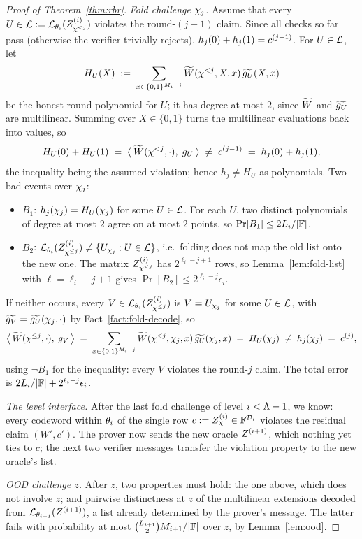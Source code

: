 \begin{proof}[Proof of Theorem~\ref{thm:rbr}]
\medskip\noindent\emph{Fold challenge $\chi_j$.}
Assume that every $U \in \mathcal{L} := \mathcal{L}_{\theta_i}(Z^{(i)}_{\chi^{<j}})$ violates the round-$(j{-}1)$ claim. Since all checks so far pass (otherwise the verifier trivially rejects), $h_j(0) + h_j(1) = c^{(j-1)}$. For $U \in \mathcal{L}$, let
\[
H_U(X) \;:=\; \sum_{x \in \{0,1\}^{M_i - j}} \widetilde{W}(\chi^{<j}, X, x)\, \widetilde{g_U}(X, x)
\]
be the honest round polynomial for $U$; it has degree at most $2$, since $\widetilde{W}$ and $\widetilde{g_U}$ are multilinear. Summing over $X \in \{0, 1\}$ turns the multilinear evaluations back into values, so
\[
H_U(0) + H_U(1) \;=\; \bigl\langle\, \widetilde{W}(\chi^{<j}, \cdot),\; g_U \,\bigr\rangle \;\neq\; c^{(j-1)} \;=\; h_j(0) + h_j(1),
\]
the inequality being the assumed violation; hence $h_j \neq H_U$ as polynomials. Two bad events over $\chi_j$:
\begin{itemize}[itemsep=1pt]
\item $B_1$: $h_j(\chi_j) = H_U(\chi_j)$ for some $U \in \mathcal{L}$. For each $U$, two distinct polynomials of degree at most $2$ agree on at most $2$ points, so $\Pr[B_1] \le 2 L_i / |\mathbb{F}|$.
\item $B_2$: $\mathcal{L}_{\theta_i}(Z^{(i)}_{\chi^{\le j}}) \neq \{ U_{\chi_j} : U \in \mathcal{L} \}$, i.e.\ folding does not map the old list onto the new one. The matrix $Z^{(i)}_{\chi^{<j}}$ has $2^{\ell_i - j + 1}$ rows, so Lemma~\ref{lem:fold-list} with $\ell = \ell_i - j + 1$ gives $\Pr[B_2] \le 2^{\ell_i - j} \epsilon_i$.
\end{itemize}
If neither occurs, every $V \in \mathcal{L}_{\theta_i}(Z^{(i)}_{\chi^{\le j}})$ is $V = U_{\chi_j}$ for some $U \in \mathcal{L}$, with $\widetilde{g_V} = \widetilde{g_U}(\chi_j, \cdot)$ by Fact~\ref{fact:fold-decode}, so
\[
\bigl\langle\, \widetilde{W}(\chi^{\le j}, \cdot),\; g_V \,\bigr\rangle
\;=\; \sum_{x \in \{0,1\}^{M_i - j}} \widetilde{W}(\chi^{<j}, \chi_j, x)\, \widetilde{g_U}(\chi_j, x)
\;=\; H_U(\chi_j) \;\neq\; h_j(\chi_j) \;=\; c^{(j)} ,
\]
using $\neg B_1$ for the inequality: every $V$ violates the round-$j$ claim. The total error is $2 L_i/|\mathbb{F}| + 2^{\ell_i - j} \epsilon_i$.

\medskip\noindent\emph{The level interface.}
After the last fold challenge of level $i < \Lambda - 1$, we know: every codeword within $\theta_i$ of the single row $c := Z^{(i)}_\chi \in \mathbb{F}^{\mathcal{D}_i}$ violates the residual claim $(W', c')$. The prover now sends the new oracle $Z^{(i+1)}$, which nothing yet ties to $c$; the next two verifier messages transfer the violation property to the new oracle's list.

\medskip\noindent\emph{OOD challenge $z$.}
After $z$, two properties must hold: the one above, which does not involve $z$; and pairwise distinctness at $z$ of the multilinear extensions decoded from $\mathcal{L}_{\theta_{i+1}}(Z^{(i+1)})$, a list already determined by the prover's message. The latter fails with probability at most $\binom{L_{i+1}}{2} M_{i+1} / |\mathbb{F}|$ over $z$, by Lemma~\ref{lem:ood}.


\end{proof}
